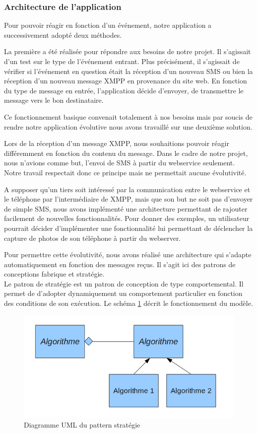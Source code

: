 \subsubsection{Architecture de l'application}
 
Pour pouvoir réagir en fonction d'un événement, notre application a successivement adopté deux méthodes.
 
La première a été réalisée pour répondre aux besoins de notre projet. Il s'agissait d'un test sur le 
type de l'événement entrant. Plus précisément, il s'agissait de vérifier si l’événement en question 
était la réception d'un nouveau SMS ou bien la réception d'un nouveau message XMPP en provenance du 
site web. En fonction du type de message en entrée, l'application décide d'envoyer, de  transmettre le message
vers le bon destinataire. 
 
Ce fonctionnement basique convenait totalement à nos besoins mais par soucis de rendre notre application
évolutive nous avons travaillé sur une deuxième solution.
 
Lors de la réception d'un message XMPP, nous souhaitions pouvoir réagir différemment en fonction du contenu
du message. Dans le cadre de notre projet, nous n'avions comme but, l'envoi de SMS à partir du webservice
seulement. Notre travail respectait donc ce principe mais ne permettait aucune évolutivité.
 
A supposer qu'un tiers soit intéressé par la communication entre le webservice et le téléphone par 
l'intermédiaire de XMPP, mais que son but ne soit pas d'envoyer de simple SMS, nous avons implémenté une
architecture permettant de rajouter facilement de nouvelles fonctionnalités. Pour donner des exemples, 
un utilisateur pourrait décider d'implémenter une fonctionnalité lui permettant de déclencher la capture
de photos de son téléphone à partir du webserver.
 
Pour permettre cette évolutivité, nous avons réalisé une architecture qui s'adapte automatiquement en
fonction des messages reçus. Il s'agit ici des patrons de conceptions fabrique et stratégie. 
\\
 
 
Le patron de stratégie est un patron de conception de type comportemental. Il permet de d'adopter 
dynamiquement un comportement particulier en fonction des conditions de son exécution. Le schéma 
\ref{pattern_strategie} décrit le fonctionnement du modèle.
 
\begin{figure}[H]
  \center
  \includegraphics[width=12cm]{img/pattern_strategie.png}
  \caption{Diagramme UML du pattern stratégie}
  \label{pattern_strategie}
\end{figure}
 
